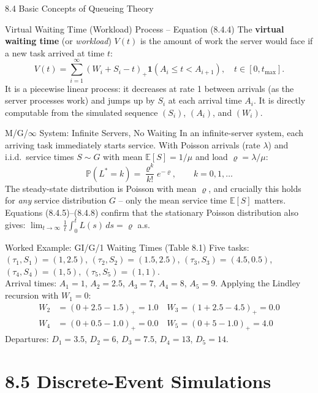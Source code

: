 \documentclass[aspectratio=169,10pt]{beamer}
\newcommand{\E}{\mathbb{E}}
\newcommand{\Prob}{\mathbb{P}}
\begin{document}
\begin{frame}[allowframebreaks]{8.4 Basic Concepts of Queueing Theory}
\framebreak

\begin{block}{Virtual Waiting Time (Workload) Process -- Equation (8.4.4)}
The \textbf{virtual waiting time} (or \emph{workload}) $V(t)$ is the amount of
work the server would face if a new task arrived at time $t$:
\[
  V(t) = \sum_{i=1}^\infty (W_i + S_i - t)_+ \mathbf{1}(A_i \le t < A_{i+1}),
  \quad t \in [0, t_{\max}].
\]
It is a piecewise linear process: it decreases at rate 1 between arrivals (as the
server processes work) and jumps up by $S_i$ at each arrival time $A_i$.  It is
directly computable from the simulated sequence $(S_i)$, $(A_i)$, and $(W_i)$.
\end{block}

\begin{block}{M/G/$\infty$ System: Infinite Servers, No Waiting}
In an infinite-server system, each arriving task immediately starts service.
With Poisson arrivals (rate $\lambda$) and i.i.d.\ service times $S \sim G$
with mean $\E[S] = 1/\mu$ and load $\varrho = \lambda/\mu$:
\[
  \Prob(L^* = k) = \frac{\varrho^k}{k!}e^{-\varrho}, \qquad k = 0, 1, \ldots
\]
The steady-state distribution is Poisson with mean $\varrho$, and crucially this
holds for \emph{any} service distribution $G$ -- only the mean service time
$\E[S]$ matters.  Equations (8.4.5)--(8.4.8) confirm that the stationary
Poisson distribution also gives:
$\lim_{t\to\infty}\frac{1}{t}\int_0^t L(s)\,ds = \varrho$ a.s.
\end{block}

\begin{exampleblock}{Worked Example: GI/G/1 Waiting Times (Table 8.1)}
Five tasks: $(\tau_1,S_1)=(1,2.5)$, $(\tau_2,S_2)=(1.5,2.5)$,
$(\tau_3,S_3)=(4.5,0.5)$, $(\tau_4,S_4)=(1,5)$, $(\tau_5,S_5)=(1,1)$.\\[0.2em]
Arrival times: $A_1=1$, $A_2=2.5$, $A_3=7$, $A_4=8$, $A_5=9$.
Applying the Lindley recursion with $W_1=0$:
\begin{align*}
  W_2 &= (0+2.5-1.5)_+ = 1.0 \quad W_3 = (1+2.5-4.5)_+ = 0.0 \\
  W_4 &= (0+0.5-1.0)_+ = 0.0 \quad W_5 = (0+5-1.0)_+ = 4.0
\end{align*}
Departures: $D_1=3.5$, $D_2=6$, $D_3=7.5$, $D_4=13$, $D_5=14$.
\end{exampleblock}

\end{frame}

\section{8.5 Discrete-Event Simulations}
\end{document}
